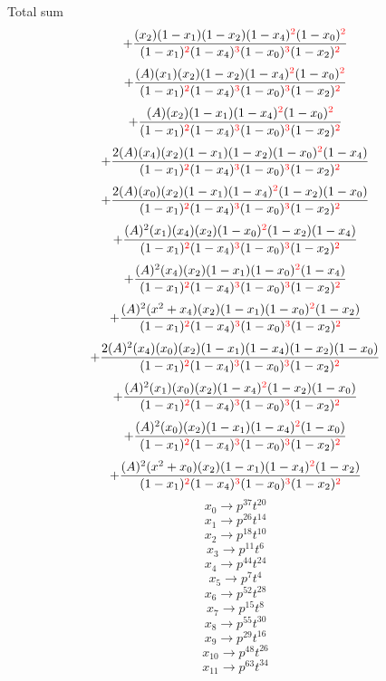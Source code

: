 \documentclass{article}
\begin{document}
Total sum
\[+\frac{(x_2)(1-x_1)(1-x_2)(1-x_4)^{\textcolor{red}{2}}(1-x_0)^{\textcolor{red}{2}}}{(1-x_1)^{\textcolor{red}{2}}(1-x_4)^{\textcolor{red}{3}}(1-x_0)^{\textcolor{red}{3}}(1-x_2)^{\textcolor{red}{2}}}\]\[+\frac{(A)(x_1)(x_2)(1-x_2)(1-x_4)^{\textcolor{red}{2}}(1-x_0)^{\textcolor{red}{2}}}{(1-x_1)^{\textcolor{red}{2}}(1-x_4)^{\textcolor{red}{3}}(1-x_0)^{\textcolor{red}{3}}(1-x_2)^{\textcolor{red}{2}}}\]\[+\frac{(A)(x_2)(1-x_1)(1-x_4)^{\textcolor{red}{2}}(1-x_0)^{\textcolor{red}{2}}}{(1-x_1)^{\textcolor{red}{2}}(1-x_4)^{\textcolor{red}{3}}(1-x_0)^{\textcolor{red}{3}}(1-x_2)^{\textcolor{red}{2}}}\]\[+\frac{2(A)(x_4)(x_2)(1-x_1)(1-x_2)(1-x_0)^{\textcolor{red}{2}}(1-x_4)}{(1-x_1)^{\textcolor{red}{2}}(1-x_4)^{\textcolor{red}{3}}(1-x_0)^{\textcolor{red}{3}}(1-x_2)^{\textcolor{red}{2}}}\]\[+\frac{2(A)(x_0)(x_2)(1-x_1)(1-x_4)^{\textcolor{red}{2}}(1-x_2)(1-x_0)}{(1-x_1)^{\textcolor{red}{2}}(1-x_4)^{\textcolor{red}{3}}(1-x_0)^{\textcolor{red}{3}}(1-x_2)^{\textcolor{red}{2}}}\]\[+\frac{(A)^{2}(x_1)(x_4)(x_2)(1-x_0)^{\textcolor{red}{2}}(1-x_2)(1-x_4)}{(1-x_1)^{\textcolor{red}{2}}(1-x_4)^{\textcolor{red}{3}}(1-x_0)^{\textcolor{red}{3}}(1-x_2)^{\textcolor{red}{2}}}\]\[+\frac{(A)^{2}(x_4)(x_2)(1-x_1)(1-x_0)^{\textcolor{red}{2}}(1-x_4)}{(1-x_1)^{\textcolor{red}{2}}(1-x_4)^{\textcolor{red}{3}}(1-x_0)^{\textcolor{red}{3}}(1-x_2)^{\textcolor{red}{2}}}\]\[+\frac{(A)^{2}(x^{2}+x_4)(x_2)(1-x_1)(1-x_0)^{\textcolor{red}{2}}(1-x_2)}{(1-x_1)^{\textcolor{red}{2}}(1-x_4)^{\textcolor{red}{3}}(1-x_0)^{\textcolor{red}{3}}(1-x_2)^{\textcolor{red}{2}}}\]\[+\frac{2(A)^{2}(x_4)(x_0)(x_2)(1-x_1)(1-x_4)(1-x_2)(1-x_0)}{(1-x_1)^{\textcolor{red}{2}}(1-x_4)^{\textcolor{red}{3}}(1-x_0)^{\textcolor{red}{3}}(1-x_2)^{\textcolor{red}{2}}}\]\[+\frac{(A)^{2}(x_1)(x_0)(x_2)(1-x_4)^{\textcolor{red}{2}}(1-x_2)(1-x_0)}{(1-x_1)^{\textcolor{red}{2}}(1-x_4)^{\textcolor{red}{3}}(1-x_0)^{\textcolor{red}{3}}(1-x_2)^{\textcolor{red}{2}}}\]\[+\frac{(A)^{2}(x_0)(x_2)(1-x_1)(1-x_4)^{\textcolor{red}{2}}(1-x_0)}{(1-x_1)^{\textcolor{red}{2}}(1-x_4)^{\textcolor{red}{3}}(1-x_0)^{\textcolor{red}{3}}(1-x_2)^{\textcolor{red}{2}}}\]\[+\frac{(A)^{2}(x^{2}+x_0)(x_2)(1-x_1)(1-x_4)^{\textcolor{red}{2}}(1-x_2)}{(1-x_1)^{\textcolor{red}{2}}(1-x_4)^{\textcolor{red}{3}}(1-x_0)^{\textcolor{red}{3}}(1-x_2)^{\textcolor{red}{2}}}\]\[x_0\rightarrow{p^{37}t^{20}}\]\[x_1\rightarrow{p^{26}t^{14}}\]\[x_2\rightarrow{p^{18}t^{10}}\]\[x_3\rightarrow{p^{11}t^{6}}\]\[x_4\rightarrow{p^{44}t^{24}}\]\[x_5\rightarrow{p^{7}t^{4}}\]\[x_6\rightarrow{p^{52}t^{28}}\]\[x_7\rightarrow{p^{15}t^{8}}\]\[x_8\rightarrow{p^{55}t^{30}}\]\[x_9\rightarrow{p^{29}t^{16}}\]\[x_10\rightarrow{p^{48}t^{26}}\]\[x_11\rightarrow{p^{63}t^{34}}\]
\end{document}
